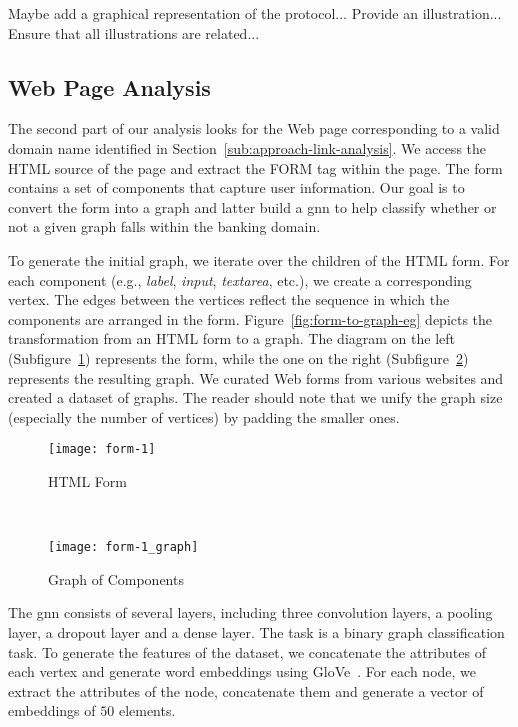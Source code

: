Maybe add a graphical representation of the protocol...
Provide an illustration... Ensure that all illustrations are related...


\subsection{Web Page Analysis} %
\label{sub:approach-web-page-analysis}

The second part of our analysis looks for the Web page corresponding to a valid domain name identified in Section~\ref{sub:approach-link-analysis}. We access the HTML source of the page and extract the FORM tag within the page. The form contains a set of components that capture user information. Our goal is to convert the form into a graph and latter build a \gls{gnn} to help classify whether or not a given graph falls within the banking domain. 

To generate the initial graph, we iterate over the children of the HTML form. For each component (e.g., \emph{label}, \emph{input}, \emph{textarea}, etc.), we create a corresponding vertex. The edges between the vertices reflect the sequence in which the components are arranged in the form.  Figure~\ref{fig:form-to-graph-eg} depicts the transformation from an HTML form to a graph. The diagram on the left (Subfigure~\ref{fig:init-form}) represents the form, while the one on the right (Subfigure~\ref{fig:final-form}) represents the resulting graph. We curated Web forms from various websites and created a dataset of graphs. The reader should note that we unify the graph size (especially the number of vertices) by padding the smaller ones.

\begin{figure*}[th!]
    \centering
    \begin{subfigure}[t]{0.5\textwidth}
        \centering
        \texttt{[image: form-1]}
        \caption{HTML Form}
        \label{fig:init-form}
    \end{subfigure}%
    ~ 
    \begin{subfigure}[t]{0.5\textwidth}
        \centering
        \texttt{[image: form-1\_graph]}
        \caption{Graph of Components}
        \label{fig:final-form}
    \end{subfigure}
    \caption{From Form to Graph}
    \label{fig:form-to-graph-eg}
\end{figure*}

The \gls{gnn} consists of several layers, including three convolution layers, a pooling layer, a dropout layer and a dense layer. The task is a binary graph classification task. To generate the features of the dataset, we concatenate the attributes of each vertex and generate word embeddings using GloVe~\cite{pennington-socher-manning:2014}. For each node, we extract the attributes of the node, concatenate them and generate a vector of embeddings of $50$ elements. 


